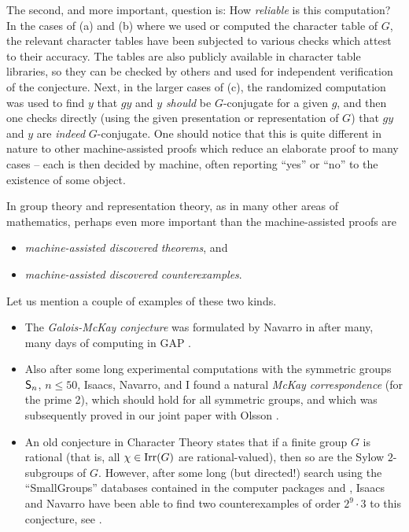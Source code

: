 The second, and more important, question is: How {\it reliable} is this computation? In the cases of (a) and (b) where we used or computed the character table of $G$,  the relevant character tables have been subjected to various checks which attest to their accuracy.  The tables are also publicly available in character table libraries, so they can be checked by others and used for independent verification of the conjecture. 
Next, in the larger cases of (c), the randomized computation was used to find $y$ that $gy$ and $y$ {\it should} be $G$-conjugate for
a given $g$, and then one checks directly (using the given presentation or representation of $G$) that $gy$ and $y$ are {\it indeed}
$G$-conjugate. One should notice that this is quite different in nature to other machine-assisted proofs which reduce an elaborate proof to many cases -- each is then decided by machine, often reporting ``yes'' or ``no'' to the existence of some object.

\bigskip
In group theory and representation theory, as in many other areas of mathematics, perhaps even more important than 
the machine-assisted proofs are

\begin{itemize}
\item {\it machine-assisted discovered theorems}, and  
\item {\it machine-assisted discovered counterexamples}.
\end{itemize}
Let us mention a couple of examples of these two kinds.

\begin{itemize}
\item The {\it Galois-McKay conjecture} 
was formulated by Navarro in \cite{N} after many, many days of computing in {\sf GAP} \cite{GAP}.

\item Also after some long experimental computations with the symmetric groups ${\sf S}_n$, $n \leq 50$, Isaacs, Navarro, and I found a natural 
{\it McKay correspondence} (for the prime 2), which should hold for all symmetric groups, and which was subsequently 
proved in our joint paper with Olsson \cite{INOT}.

\item An old conjecture in Character Theory states that if a finite group $G$ is rational (that is, all $\chi \in {\mathrm {Irr}}(G)$ are 
rational-valued), then so are the Sylow $2$-subgroups of $G$. However, after some long (but directed!) search using 
the ``SmallGroups'' databases contained in the computer packages \cite{GAP} and \cite{Magma}, 
Isaacs and Navarro have been able to find two counterexamples of order $2^9 \cdot 3$ to this conjecture, see \cite{IN}. 
\end{itemize}

